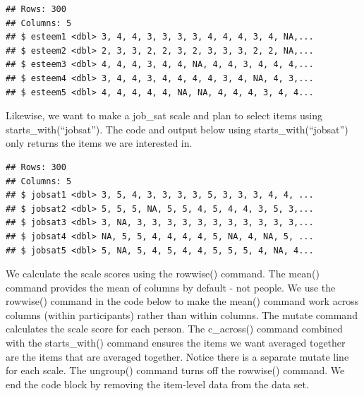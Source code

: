 \documentclass[
]{krantz}
\makeatletter
\newenvironment{Shaded}{\begin{snugshade}}{\end{snugshade}}
\newcommand{\KeywordTok}[1]{\textcolor[rgb]{0.27,0.27,0.27}{\textbf{#1}}}
\newcommand{\NormalTok}[1]{#1}
\newcommand{\OperatorTok}[1]{\textcolor[rgb]{0.43,0.43,0.43}{\textbf{#1}}}
\newcommand{\StringTok}[1]{\textcolor[rgb]{0.5,0.5,0.5}{#1}}
\newenvironment{kframe}{%
\medskip{}
\setlength{\fboxsep}{.8em}
 \def\at@end@of@kframe{}%
 \ifinner\ifhmode%
  \def\at@end@of@kframe{\end{minipage}}%
  \begin{minipage}{\columnwidth}%
 \fi\fi%
 \def\FrameCommand##1{\hskip\@totalleftmargin \hskip-\fboxsep
 \colorbox{shadecolor}{##1}\hskip-\fboxsep
     \hskip-\linewidth \hskip-\@totalleftmargin \hskip\columnwidth}%
 \MakeFramed {\advance\hsize-\width
   \@totalleftmargin\z@ \linewidth\hsize
   \@setminipage}}%
 {\par\unskip\endMakeFramed%
 \at@end@of@kframe}
\renewenvironment{Shaded}{\begin{kframe}}{\end{kframe}}
\makeatother
\begin{document}
\begin{Shaded}
\end{Shaded}

\begin{verbatim}
## Rows: 300
## Columns: 5
## $ esteem1 <dbl> 3, 4, 4, 3, 3, 3, 3, 4, 4, 4, 3, 4, NA,...
## $ esteem2 <dbl> 2, 3, 3, 2, 2, 3, 2, 3, 3, 3, 2, 2, NA,...
## $ esteem3 <dbl> 4, 4, 4, 3, 4, 4, NA, 4, 4, 3, 4, 4, 4,...
## $ esteem4 <dbl> 3, 4, 4, 3, 4, 4, 4, 4, 3, 4, NA, 4, 3,...
## $ esteem5 <dbl> 4, 4, 4, 4, 4, NA, NA, 4, 4, 4, 3, 4, 4...
\end{verbatim}

Likewise, we want to make a job\_sat scale and plan to select items using starts\_with(``jobsat''). The code and output below using starts\_with(``jobsat'') only returns the items we are interested in.

\begin{Shaded}
\end{Shaded}

\begin{verbatim}
## Rows: 300
## Columns: 5
## $ jobsat1 <dbl> 3, 5, 4, 3, 3, 3, 3, 5, 3, 3, 3, 4, 4, ...
## $ jobsat2 <dbl> 5, 5, 5, NA, 5, 5, 4, 5, 4, 4, 3, 5, 3,...
## $ jobsat3 <dbl> 3, NA, 3, 3, 3, 3, 3, 3, 3, 3, 3, 3, 3,...
## $ jobsat4 <dbl> NA, 5, 5, 4, 4, 4, 4, 5, NA, 4, NA, 5, ...
## $ jobsat5 <dbl> 5, NA, 5, 4, 5, 4, 4, 5, 5, 5, 4, NA, 4...
\end{verbatim}

We calculate the scale scores using the rowwise() command. The mean() command provides the mean of columns by default - not people. We use the rowwise() command in the code below to make the mean() command work across columns (within participants) rather than within columns. The mutate command calculates the scale score for each person. The c\_across() command combined with the starts\_with() command ensures the items we want averaged together are the items that are averaged together. Notice there is a separate mutate line for each scale. The ungroup() command turns off the rowwise() command. We end the code block by removing the item-level data from the data set.
\end{document}
